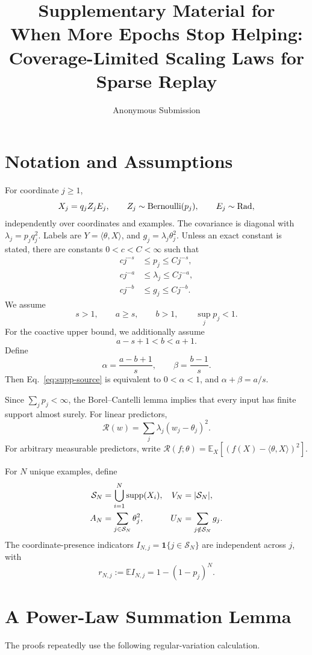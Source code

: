 \documentclass[letterpaper]{article}
\title{Supplementary Material for\\
When More Epochs Stop Helping: Coverage-Limited Scaling Laws for Sparse Replay}
\author{Anonymous Submission}
\newcommand{\E}{\mathbb E}
\newcommand{\R}{\mathcal R}
\newcommand{\cS}{\mathcal S}
\newcommand{\1}{\mathbf 1}
\begin{document}
\maketitle

\section{Notation and Assumptions}

For coordinate $j\ge1$,
\[
X_j=q_jZ_jE_j,
\qquad Z_j\sim{\rm Bernoulli}(p_j),
\qquad E_j\sim{\rm Rad},
\]
independently over coordinates and examples. The covariance is diagonal with
$\lambda_j=p_jq_j^2$. Labels are $Y=\langle\theta,X\rangle$, and
$g_j=\lambda_j\theta_j^2$. Unless an exact constant is stated, there are
constants $0<c<C<\infty$ such that
\begin{align*}
cj^{-s}&\le p_j\le Cj^{-s},\\
cj^{-a}&\le\lambda_j\le Cj^{-a},\\
cj^{-b}&\le g_j\le Cj^{-b}.
\end{align*}
We assume
\[
s>1,
\qquad a\ge s,
\qquad b>1,
\qquad \sup_jp_j<1.
\]
For the coactive upper bound, we additionally assume
\begin{equation}
a-s+1<b<a+1.
\label{eq:supp-source}
\end{equation}
Define
\[
\alpha=\frac{a-b+1}{s},
\qquad
\beta=\frac{b-1}{s}.
\]
Then Eq.~\eqref{eq:supp-source} is equivalent to $0<\alpha<1$, and
$\alpha+\beta=a/s$.

Since $\sum_jp_j<\infty$, the Borel--Cantelli lemma implies that every input
has finite support almost surely. For linear predictors,
\[
\R(w)=\sum_j\lambda_j(w_j-\theta_j)^2.
\]
For arbitrary measurable predictors, write
$\R(f;\theta)=\E_X[(f(X)-\langle\theta,X\rangle)^2]$.

For $N$ unique examples, define
\begin{align*}
\cS_N&=\bigcup_{i=1}^N{\rm supp}(X_i),
&V_N&=|\cS_N|,\\
A_N&=\sum_{j\in\cS_N}\theta_j^2,
&U_N&=\sum_{j\notin\cS_N}g_j.
\end{align*}
The coordinate-presence indicators
$I_{N,j}=\1\{j\in\cS_N\}$ are independent across $j$, with
\[
r_{N,j}:=\E I_{N,j}=1-(1-p_j)^N.
\]

\section{A Power-Law Summation Lemma}

The proofs repeatedly use the following regular-variation calculation.
\end{document}
